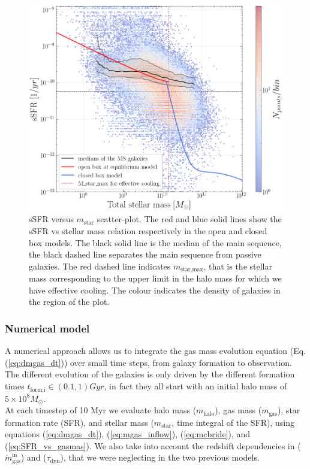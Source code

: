 \documentclass[fleqn,usenatbib]{mnras}
\begin{document}
\begin{figure}\centering
	\includegraphics[width=0.86\columnwidth]{images/sSFR_mass_due_andamenti.png}
    \caption{sSFR versus $m_\text{star}$ scatter-plot.
    The red and blue solid lines show the sSFR vs stellar mass relation respectively in the open and closed box models.
    The black solid line is the median of the main sequence, the black dashed line separates the main sequence from passive galaxies. The red dashed line indicates $m_\text{star,max}$, that is the stellar mass corresponding to the upper limit in the halo mass for which we have effective cooling. The colour indicates the density of galaxies in the region of the plot.}
    \label{fig:mixed_open_closed}
\end{figure}


\subsubsection{\textbf{Numerical model}}

A numerical approach allows us to integrate the gas mass evolution equation (Eq.(\ref{eq:dmgas_dt})) over small time steps, from galaxy formation to observation.\\
The different evolution of the galaxies is only driven by the different formation times $t_\text{form,i} \in \left( 0.1, 1 \right) Gyr$, in fact they all start with an initial halo mass of $5 \times 10^8 M_\odot$.\\
At each timestep of 10 Myr we evaluate halo mass ($m_\text{halo}$), gas mass ($m_\text{gas}$), star formation rate (SFR), and  stellar mass ($m_\text{star}$, time integral of the SFR), using equations (\ref{eq:dmgas_dt}), (\ref{eq:mgas_inflow}), (\ref{eq:mcbride}), and (\ref{eq:SFR_vs_gasmas}). We also take into account the redshift dependencies in ($\dot{m}_\text{gas}^\text{in}$) and ($\tau_\text{dyn}$), that we were neglecting in the two previous models.
\end{document}
